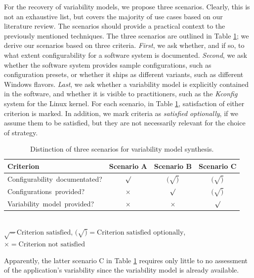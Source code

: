 For the recovery of variability models, we propose three scenarios. Clearly,
this is not an exhaustive list, but covers the majority of use cases based on
our literature review. The scenarios should provide a practical context to the
previously mentioned techniques. The three scenarios are outlined in Table
\ref{tab:synthesis}; we derive our scenarios based on three criteria.
\emph{First}, we ask whether, and if so, to what extent configurability for a
software system is documented. \emph{Second}, we ask whether the software
system provides sample configurations, such as configuration presets, or
whether it ships as different variants, such as different Windows flavors.
\emph{Last}, we ask whether a variability model is explicitly contained in the
software, and whether it is visible to practitioners, such as the \emph{Kconfig}
system for the Linux kernel. For each scenario, in Table \ref{tab:synthesis},
satisfaction of either criterion is marked. In addition, we mark criteria as
\emph{satisfied optionally}, if we assume them to be satisfied, but they are
not necessarily relevant for the choice of strategy.

\begin{table} 
	\centering
	\begin{tabular}{lccc}%
	\toprule
	\textbf{Criterion} & \textbf{Scenario A} & \textbf{Scenario B} &
	\textbf{Scenario C}
	\\
	\midrule
	\mbox{Configurability documentated?} & $\surd$ & $(\surd)$ & $(\surd)$ \\
	\mbox{Configurations provided?} & $\times$ & $\surd$ & $(\surd)$ \\
	\mbox{Variability model provided?} & $\times$ & $\times$ & $\surd$ \\
	\bottomrule
	\end{tabular}\\
	\vspace{1mm}
	{\footnotesize $\surd = \text{Criterion satisfied}$, $(\surd) =
	\text{Criterion satisfied optionally}$, $\times = \text{Criterion not
	satisfied}$}
	\caption{Distinction of three scenarios for variability model synthesis. }
	\label{tab:synthesis}
\end{table}

Apparently, the latter scenario C in Table \ref{tab:synthesis} requires only
little to no assessment of the application's variability since the variability
model is already available.


